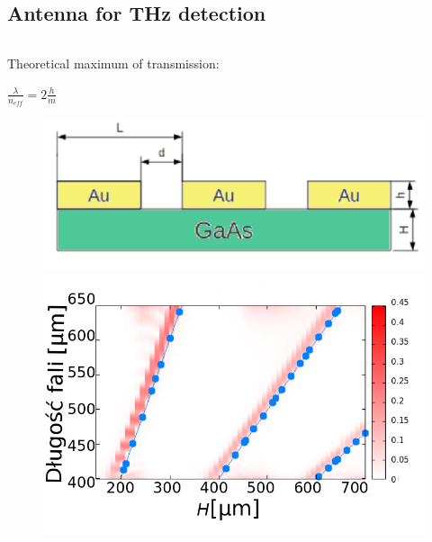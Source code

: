 \documentclass{beamer}
\begin{document}
\subsection{Antenna for THz detection}
\begin{frame}
	\begin{columns}
		\begin{column}{0.5\textwidth}
			{\tiny Theoretical maximum of transmission:}\\
			\centerline{$\frac{\lambda}{n_{eff}}=2\frac{h}{m}$}
			\begin{figure}[htb]
				\includegraphics[width=.9\textwidth]{../images/antenaThz/schemat.png}\\
				\includegraphics[width=.9\textwidth]{../images/antenaThz/rezonant_trans_f001.png}\\
			\end{figure}
		

\end{column}
\end{columns}
\end{frame}
\end{document}
